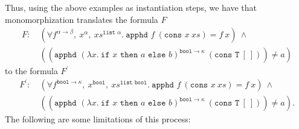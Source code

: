 \documentclass{article}
\begin{document}
	Thus, using the above examples as 
	instantiation steps, we have that 
	monomorphization translates the formula $F$
	\begin{align*}
	F:\ &(\forall f^{\alpha \to \beta},\ 
	x^{\alpha},\ xs^{\texttt{list }\alpha}.\ 
	\texttt{apphd }f\ (\texttt{cons }x
	\ xs) = f\ x)\ \land\ \\
	&((\texttt{apphd }(\lambda x.\ 
	\texttt{if }x \texttt{ then }a 
	\texttt{ else } b)^{\texttt{bool} 
		\to \kappa}\ (\texttt{cons T}\ [\ ])) 
	\neq a)
	\end{align*}
	to the formula $F^{\prime}$
	\begin{align*}
	F^{\prime}:\ &(\forall 
	f^{\texttt{bool} \to \kappa},\ 
	x^{\texttt{bool}},\ 
	xs^{\texttt{list bool}}.\ 
	\texttt{apphd }f\ (\texttt{cons }x
	\ xs) = f\ x) \ \land\ \\
	&((\texttt{apphd } (\lambda x.\ 
	\texttt{if }x \texttt{ then }a 
	\texttt{ else } b)^{\texttt{bool} 
		\to \kappa}\ (\texttt{cons T}\ 
	[\ ])) \neq a).
	\end{align*}
	\noindent The following are some 
	limitations of this process:
\end{document}
